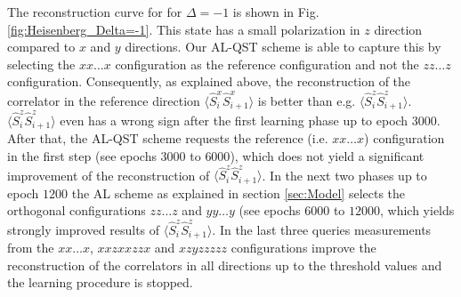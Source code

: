 \documentclass[pra,aps,showpacs,groupedaddress,superscriptaddress,twocolumn,toc=flat,biblatex,footinbib]{revtex4-1}
\begin{document}
The reconstruction curve for for $\Delta=-1$ is shown in Fig. \ref{fig:Heisenberg_Delta=-1}. This state has a small polarization in $z$ direction compared to $x$ and $y$ directions. Our AL-QST scheme is able to capture this by selecting the $xx\dots x$ configuration as the reference configuration and not the $zz\dots z$ configuration. Consequently, as explained above, the reconstruction of the correlator in the reference direction $\langle \hat{S}_i^x \hat{S}_{i+1}^{x}\rangle$ is better than e.g.  $\langle \hat{S}_i^z \hat{S}_{i+1}^{z}\rangle$. $\langle \hat{S}_i^z \hat{S}_{i+1}^{z}\rangle$ even has a wrong sign after the first learning phase up to epoch $3000$. After that, the AL-QST scheme requests the reference (i.e. $xx\dots x$) configuration in the first step (see epochs $3000$ to $6000$), which does not yield a significant improvement of the reconstruction of $\langle \hat{S}_i^z \hat{S}_{i+1}^{z}\rangle$. In the next two phases up to epoch $1200$ the AL scheme as explained in section \ref{sec:Model} selects the orthogonal configurations $zz\dots z$ and $yy\dots y$ (see epochs $6000$ to $12000$, which yields strongly improved results of $\langle \hat{S}_i^z \hat{S}_{i+1}^{z}\rangle$. In the last three queries measurements from the $xx\dots x$, $xxzxxzzx$ and $xzyzzzzz$ configurations improve the reconstruction of the correlators in all directions up to the threshold values and the learning procedure is stopped.



\end{document}
